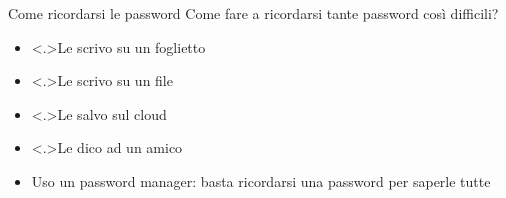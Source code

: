 \begin{myframe}{Come ricordarsi le password}
  Come fare a ricordarsi tante password così difficili?
  \pause
  \begin{itemize}[<+->]
    \item \stafter<.>{Le scrivo su un foglietto}
    \item \stafter<.>{Le scrivo su un file}
    \item \stafter<.>{Le salvo sul cloud}
    \item \stafter<.>{Le dico ad un amico}
    \item Uso un password manager: basta ricordarsi una password per saperle tutte
  \end{itemize}
\end{myframe}
